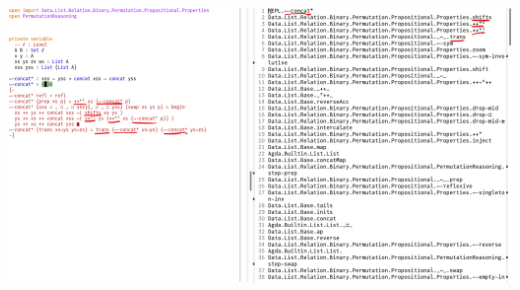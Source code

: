 \documentclass[aspectratio=169]{beamer}
\begin{document}
\begin{frame}[plain]
	\includegraphics[width=\textwidth]{interface.png}
\end{frame}
\end{document}
